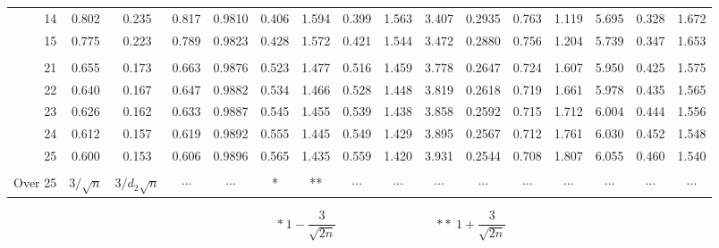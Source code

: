 \documentclass{article}
\begin{document}
\begin{landscape}
\begin{center}
\begin{tabular}{|r|c|c|c|c|c|c|c|c|c|c|c|c|c|c|c|}
    14 & 0.802 & 0.235 & 0.817 & 0.9810 & 0.406 & 1.594 & 0.399 & 1.563
       & 3.407 & 0.2935 & 0.763 & 1.119 & 5.695 & 0.328 & 1.672 \\
    15 & 0.775 & 0.223 & 0.789 & 0.9823 & 0.428 & 1.572 & 0.421 & 1.544
       & 3.472 & 0.2880 & 0.756 & 1.204 & 5.739 & 0.347 & 1.653 \\
       &       &        &       &       &       &       &       &
       &       &        &       &       &       &       &       \\
    21 & 0.655 & 0.173 & 0.663 & 0.9876 & 0.523 & 1.477 & 0.516 & 1.459
       & 3.778 & 0.2647 & 0.724 & 1.607 & 5.950 & 0.425 & 1.575 \\
    22 & 0.640 & 0.167 & 0.647 & 0.9882 & 0.534 & 1.466 & 0.528 & 1.448
       & 3.819 & 0.2618 & 0.719 & 1.661 & 5.978 & 0.435 & 1.565 \\
    23 & 0.626 & 0.162 & 0.633 & 0.9887 & 0.545 & 1.455 & 0.539 & 1.438
       & 3.858 & 0.2592 & 0.715 & 1.712 & 6.004 & 0.444 & 1.556 \\
    24 & 0.612 & 0.157 & 0.619 & 0.9892 & 0.555 & 1.445 & 0.549 & 1.429
       & 3.895 & 0.2567 & 0.712 & 1.761 & 6.030 & 0.452 & 1.548 \\
    25 & 0.600 & 0.153 & 0.606 & 0.9896 & 0.565 & 1.435 & 0.559 & 1.420
       & 3.931 & 0.2544 & 0.708 & 1.807 & 6.055 & 0.460 & 1.540 \\
       &       &        &       &       &       &       &       &
       &       &        &       &       &       &       &       \\
    Over 25 & $3/\sqrt{n}$ & $3/d_2\sqrt{n}$ & $\cdots$ & $\cdots$ & * & ** 
       & $\cdots$ & $\cdots$ & $\cdots$ & $\cdots$ & $\cdots$ & $\cdots$ 
       & $\cdots$ & $\cdots$ & $\cdots$ \\ \hline
  \end{tabular}
  \[ *\ 1-\frac{3}{\sqrt{2n}} \qquad\qquad\qquad\qquad
     \mathrm{**}\ 1+\frac{3}{\sqrt{2n}} \]
\end{center}
\end{landscape}
\end{document}
